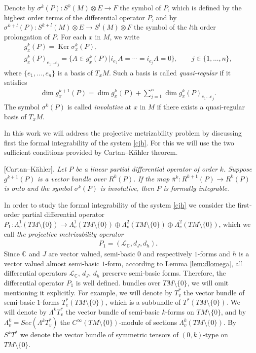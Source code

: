 \documentclass[11pt]{article}
\numberwithin{equation}{section}
\begin{document}
Denote by $\sigma^k(P): S^k(M)\otimes E \to F$ the symbol of $P$,
which is def\/ined by the highest order terms of the dif\/ferential operator
$P$, and by $\sigma^{k+l}(P): S^{k+l}(M)\otimes E \to S^l(M)
\otimes F$ the symbol of the $l$th order prolongation of $P$. For
each $x$ in $M$, we write
\begin{gather*}
g^k_x(P) = \operatorname{Ker}\sigma^k_x(P),
\\ g^k_x(P)_{e_1\dots e_j}  =  \{A \in g^k_x(P)| i_{e_1}A=\cdots =
i_{e_j}A=0\},\qquad j\in \{1,\dots ,n\},
\end{gather*}
where  $\{e_1,\dots ,e_n\}$ is a basis of $T_xM$. Such a basis is
called \emph{quasi-regular} if it satisf\/ies
\begin{gather} \dim g^{k+1}_x(P)= \dim g^k_x(P) + \sum_{j=1}^n \dim
g^k_x(P)_{e_1\dots e_j}. \label{quasir}\end{gather} The symbol
$\sigma^k(P)$ is called \emph{involutive} at
$x$ in $M$ if there exists a quasi-regular basis of $T_xM$.

In this work we will address the projective metrizability problem by
discussing f\/irst the formal integrability of the system \eqref{cjh}. For
this we will use the two suf\/f\/icient conditions provided by
Cartan--K\"ahler theorem.

\medskip

 [Cartan--K\"ahler]. {\it Let $P$ be a linear partial
differential operator of order $k$. Suppose $g^{k+1}(P)$ is a
vector bundle over $R^k(P)$. If the map $\overline{\pi}^k:
R^{k+1}(P) \to R^k(P)$ is onto and the symbol $\sigma^k(P)$ is involutive, then
$P$ is formally integrable.}

\medskip

In order to study the formal integrability of the system
\eqref{cjh} we consider the f\/irst-order partial dif\/ferential operator $P_1:
\Lambda^1_v(TM\setminus\{0\}) \to \Lambda^1_v(TM\setminus\{0\})
\oplus \Lambda^2_v(TM\setminus\{0\}) \oplus
\Lambda^2_v(TM\setminus\{0\})$, which we call \emph{the projective
  metrizability operator}
\begin{gather}
\label{p1} P_1  = \left({\mathcal L}_{\mathbb C}, d_J, d_h
\right).
\end{gather}
Since $\mathbb{C} $ and $J$ are vector valued, semi-basic $0$ and
respectively $1$-forms and
$h$ is a vector valued almost semi-basic $1$-form,  according to Lemma \ref{lem:dlomega}, all dif\/ferential
operators $\mathcal{L}_{\mathbb{C}}$, $d_J$, $d_h$ preserve
semi-basic forms. Therefore, the dif\/ferential operator $P_1$ is well
def\/ined.
bundles over $TM\setminus\{0\}$, we will omit mentioning it
explicitly. For example, we will denote by $T^*_v$ the vector
bundle of semi-basic $1$-forms $T^*_v(TM\setminus\{0\})$, which is
a subbundle of $T^*(TM\setminus\{0\})$. We will denote by
$\Lambda^kT^*_v$ the vector bundle of semi-basic $k$-forms on
$TM\setminus\{0\}$, and by
$\Lambda^k_v=Sec\left(\Lambda^kT^*_v\right)$ the
$C^{\infty}(TM\setminus\{0\})$-module of sections $\Lambda^k_v(TM\setminus\{0\})$. By $S^kT^*$ we denote the vector
bundle of symmetric tensors of $(0,k)$-type on $TM\setminus\{0\}$.
\end{document}
